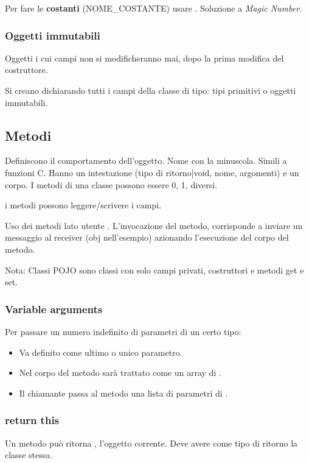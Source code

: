 
Per fare le \textbf{costanti} (NOME\_COSTANTE) usare . Soluzione a \textit{Magic Number}.

\subsubsection{Oggetti immutabili}
Oggetti i cui campi non si modificheranno mai, dopo la prima modifica del costruttore.

Si creano dichiarando  tutti i campi della classe di tipo: tipi primitivi o oggetti immutabili.

\subsection{Metodi}
Definiscono il comportamento dell'oggetto. Nome con la minuscola.
Simili a funzioni C. Hanno un intestazione (tipo di ritorno|void, nome, argomenti) e un corpo.
I metodi di una classe possono essere 0, 1, diversi.

i metodi possono leggere/scrivere i campi.

Uso dei metodi lato utente . L'invocazione del metodo, corrisponde a inviare un messaggio al receiver (obj nell'esempio) azionando l'esecuzione del corpo del metodo.


Nota: Classi POJO sono classi con solo campi privati, costruttori e metodi get e set.

\subsubsection{Variable arguments}
Per passare un numero indefinito di parametri di un certo tipo:

\begin{itemize}
	\item Va definito come ultimo o unico parametro.
	\item Nel corpo del metodo sarà trattato come un array di .
	\item Il chiamante passa al metodo una lista di parametri di .
\end{itemize}

\subsubsection{return this}
Un metodo può ritorna , l'oggetto corrente. Deve avere come tipo di ritorno la classe stessa.

